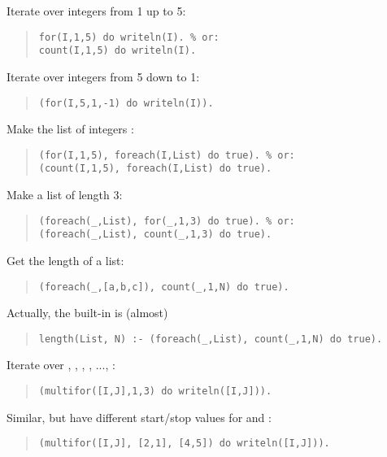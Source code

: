 Iterate over integers from 1 up to 5:
\begin{quote}
\begin{verbatim}
for(I,1,5) do writeln(I). % or:
count(I,1,5) do writeln(I).
\end{verbatim}
\end{quote}

Iterate over integers from 5 down to 1:
\begin{quote}
\begin{verbatim}
(for(I,5,1,-1) do writeln(I)).
\end{verbatim}
\end{quote}

Make the list of integers \notation{[1,2,3,4,5]}:
\begin{quote}
\begin{verbatim}
(for(I,1,5), foreach(I,List) do true). % or:
(count(I,1,5), foreach(I,List) do true).
\end{verbatim}
\end{quote}

Make a list of length 3:
\begin{quote}
\begin{verbatim}
(foreach(_,List), for(_,1,3) do true). % or:
(foreach(_,List), count(_,1,3) do true).
\end{verbatim}
\end{quote}

Get the length of a list:
\begin{quote}
\begin{verbatim}
(foreach(_,[a,b,c]), count(_,1,N) do true).
\end{verbatim}
\end{quote}

Actually, the  built-in is (almost)
\begin{quote}
\begin{verbatim}
length(List, N) :- (foreach(_,List), count(_,1,N) do true).
\end{verbatim}
\end{quote}

Iterate \notation{[I,J]} over \notation{[1,1]}, \notation{[1,2]},
 \notation{[1,3]}, \notation{[2,1]}, ..., \notation{[3,3]}:
\begin{quote}
\begin{verbatim}
(multifor([I,J],1,3) do writeln([I,J])).
\end{verbatim}
\end{quote}

Similar, but have different start/stop values for  and :
\begin{quote}
\begin{verbatim}
(multifor([I,J], [2,1], [4,5]) do writeln([I,J])).
\end{verbatim}
\end{quote}

